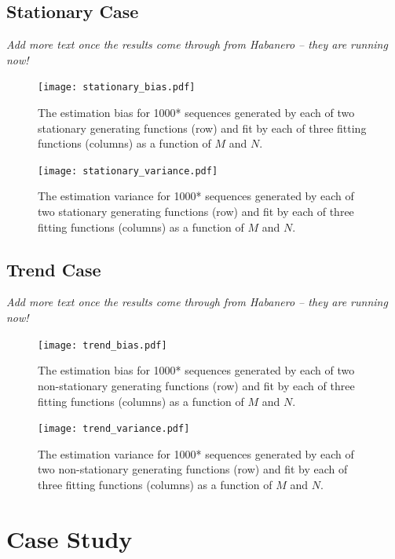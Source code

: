 \documentclass[12pt]{article}
\begin{document}
\subsection{Stationary Case}

\emph{Add more text once the results come through from Habanero -- they are running now!}

\begin{figure}[ht]
  \texttt{[image: stationary\_bias.pdf]}
  \caption{The estimation bias for 1000* sequences generated by each of two stationary generating functions (row) and fit by each of three fitting functions (columns) as a function of \(M\) and \(N\).\label{fig:stationary-bias}}
\end{figure}

\begin{figure}[ht]
  \texttt{[image: stationary\_variance.pdf]}
  \caption{The estimation variance for 1000* sequences generated by each of two stationary generating functions (row) and fit by each of three fitting functions (columns) as a function of \(M\) and \(N\).\label{fig:stationary-bias}}
\end{figure}

\subsection{Trend Case}

\emph{Add more text once the results come through from Habanero -- they are running now!}

\begin{figure}[ht]
  \texttt{[image: trend\_bias.pdf]}
  \caption{The estimation bias for 1000* sequences generated by each of two non-stationary generating functions (row) and fit by each of three fitting functions (columns) as a function of \(M\) and \(N\).\label{fig:stationary-bias}}
\end{figure}

\begin{figure}[ht]
  \texttt{[image: trend\_variance.pdf]}
  \caption{The estimation variance for 1000* sequences generated by each of two non-stationary generating functions (row) and fit by each of three fitting functions (columns) as a function of \(M\) and \(N\).\label{fig:stationary-bias}}
\end{figure}

\section{Case Study}
\end{document}
